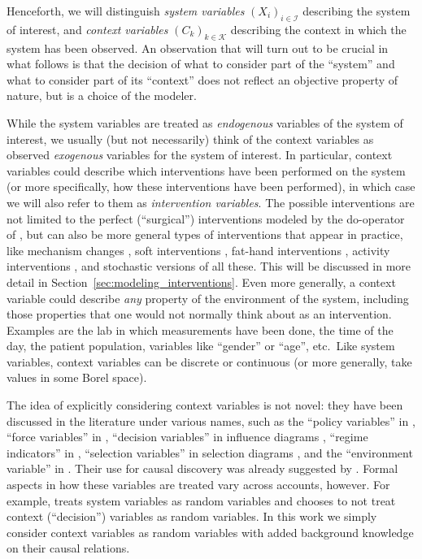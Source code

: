 \documentclass[twoside,11pt]{article}
\newcommand\C[1]{\mathcal{#1}}
\begin{document}
Henceforth, we will distinguish \emph{system variables} $(X_i)_{i \in \C{I}}$ describing the system of interest, and \emph{context variables} $(C_k)_{k\in\C{K}}$  describing the context in which the system has been observed.
An observation that will turn out to be crucial in what follows is that the decision of what to consider part of the ``system'' 
and what to consider part of its ``context'' does not reflect an objective property of nature, but is a choice of the modeler.

While the system variables are treated as \emph{endogenous} variables of the system of interest,
we usually (but not necessarily) think of the context variables as observed \emph{exogenous} 
variables for the system of interest. In particular, context variables could describe which interventions have been performed on the system (or more specifically, how these interventions have been performed), in which case we will also refer to them as \emph{intervention variables}. The possible interventions are not limited to the perfect (``surgical'') interventions modeled by the do-operator of \citet{Pearl2009}, but can also be more general types of interventions
that appear in practice, like mechanism changes \citep{TianPearl2001}, soft interventions \citep{Markowetz++2005}, fat-hand interventions \citep{EatonMurphy07}, activity interventions \citep{MooijHeskes_UAI_13}, and stochastic versions of all these.
This will be discussed in more detail in Section~\ref{sec:modeling_interventions}. 
Even more generally,
a context variable could describe \emph{any} property of the environment of the system, including those
properties that one would not normally think about as an intervention. Examples are the lab in 
which measurements have been done, the time of the day, the patient population, variables like
``gender'' or ``age'', etc.\ Like system variables, context variables can be discrete or continuous (or
more generally, take values in some Borel space).

The idea of explicitly considering context variables is not novel: they have been discussed in the literature
under various names, such as the ``policy variables'' in \citep{SGS2000},
``force variables'' in \citet{Pearl1993b}, 
``decision variables'' in influence diagrams \citep{Dawid2002}, 
``regime indicators'' in \citet{Didelez++2006},
``selection variables'' in selection diagrams \citep{BareinboimPearl2013}, 
and the ``environment variable'' in \citet{ICP2016}.
Their use for causal discovery was already suggested by \citet{CooperYoo1999}.
Formal aspects in how these variables are treated vary across accounts, however.
For example, \citet{Dawid2002} treats system variables as random variables and chooses
to not treat context (``decision'') variables as random variables.
In this work we simply consider context variables as random variables with added background
knowledge on their causal relations.
\end{document}
